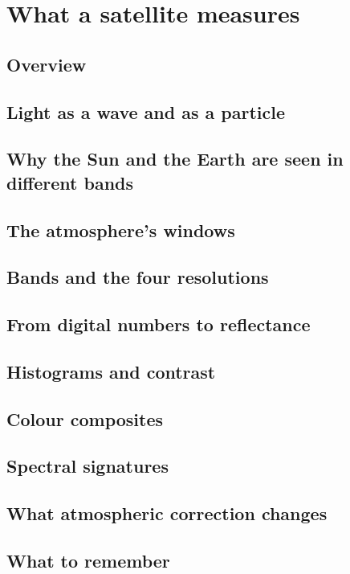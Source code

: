 \chapter{What a satellite measures}\label{ch:physics}

\section{Overview}


\section{Light as a wave and as a particle}


\section{Why the Sun and the Earth are seen in different bands}


\section{The atmosphere's windows}


\section{Bands and the four resolutions}


\section{From digital numbers to reflectance}


\section{Histograms and contrast}


\section{Colour composites}


\section{Spectral signatures}


\section{What atmospheric correction changes}


\section{What to remember}

